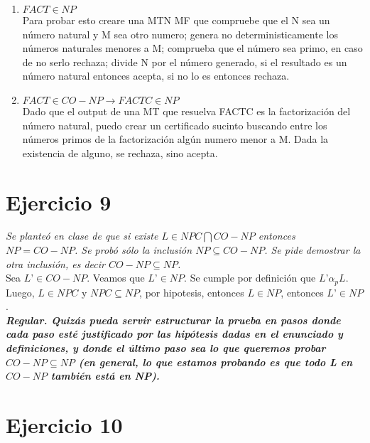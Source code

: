 \documentclass[lnbip]{svmultln}
\begin{document}
\begin{enumerate}
    \item $FACT \in NP$ \\
    
    Para probar esto creare una MTN MF que compruebe que el N sea un número natural y M sea otro numero; genera no deterministicamente los números naturales menores a M; comprueba que el número sea primo, en caso de no serlo rechaza; divide N por el número generado, si el resultado es un número natural entonces acepta, si no lo es entonces rechaza.
    
    \item $FACT \in CO-NP \rightarrow FACTC \in NP$ \\
    
    Dado que el output de una MT que resuelva FACTC es la factorización del número natural, puedo crear un certificado sucinto buscando entre los números primos de la factorización algún numero menor a M. Dada la existencia de alguno, se rechaza, sino acepta. \\
\end{enumerate}

\section{Ejercicio 9}

\textit{Se planteó en clase de que si existe $L \in NPC \bigcap CO-NP$ entonces $NP = CO-NP$. Se probó sólo la inclusión $NP \subseteq CO-NP$. Se pide demostrar la otra inclusión, es decir $CO-NP \subseteq NP$.} \\

Sea $L’ \in CO-NP$. Veamos que $L’ \in NP$. Se cumple por definición que $L’ \alpha_{p} L$. Luego, $L \in NPC$ y $NPC \subseteq NP$, por hipotesis, entonces $L \in NP$, entonces $L’ \in NP$. \\

\textbf{\textit{Regular. Quizás pueda servir estructurar la prueba en pasos donde cada paso esté justificado por las hipótesis dadas en el enunciado y definiciones, y donde el último paso sea lo que queremos probar $CO-NP \subseteq NP$ (en general, lo que estamos probando es que todo L en $CO-NP$ también está en NP).}} \\

\section{Ejercicio 10}
\end{document}
